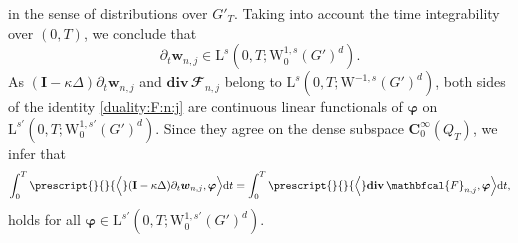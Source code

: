 \documentclass[12pt,reqno]{amsart}
\numberwithin{equation}{section}
\theoremstyle{definition}
\def\W{\mathrm{W}}
\def\L{\mathrm{L}}
\def\w{\boldsymbol{w}}
\def\bfC{\mathbf{C}}
\def\bfI{\mathbf{I}}
\def\bfi{\boldsymbol{\varphi}}
\def\bcF{\mathbfcal{F}}
\begin{document}
{{{\begin{equation*}
\end{equation*}
in the sense of distributions over $G'_T$.
Taking into account the time integrability over $(0,T)$, we conclude that
\begin{equation}\label{dwnj:dt:Ls}
\partial_t\w_{n,j} \in \L^s(0,T; \W^{1,s}_0(G')^d).
\end{equation}
As $(\bfI-\kappa\Delta)\partial_t\w_{n,j}$ and $\mathbf{div}\,\bcF_{n,j}$ belong to $\L^{s}(0,T;\W^{-1,s}(G')^d)$, both sides of the identity \eqref{duality:F:n:j} are continuous linear functionals of $\bfi$ on $\L^{s'}(0,T;\W^{1,s'}_0(G')^d)$.
Since they agree on the dense subspace $\bfC^\infty_0(Q_T)$, we infer that
\begin{equation}\label{dual:id:F:nj}
\int_{0}^{T} \prescript{}{}{\Big\langle} (\bfI-\kappa \Delta)\partial_t\w_{n,j}, \bfi \Big\rangle \mathrm{d}t=
\int_{0}^{T} \prescript{}{}{\Big\langle} \mathbf{div}\,\bcF_{n,j}, \bfi \Big\rangle \mathrm{d}t,
\end{equation}
holds for all $\bfi\in\L^{s'}(0,T;\W^{1,s'}_0(G')^d)$.

}}}
\end{document}
